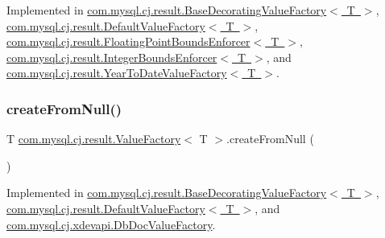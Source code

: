 Implemented in \mbox{\hyperlink{classcom_1_1mysql_1_1cj_1_1result_1_1_base_decorating_value_factory_afac99d3f28348caf19dbd661c609fb9f}{com.\+mysql.\+cj.\+result.\+Base\+Decorating\+Value\+Factory$<$ T $>$}}, \mbox{\hyperlink{classcom_1_1mysql_1_1cj_1_1result_1_1_default_value_factory_a051d2bb4762b37e5318c4b12879fee16}{com.\+mysql.\+cj.\+result.\+Default\+Value\+Factory$<$ T $>$}}, \mbox{\hyperlink{classcom_1_1mysql_1_1cj_1_1result_1_1_floating_point_bounds_enforcer_adafc614949f2e805f53f8d2c2a84923d}{com.\+mysql.\+cj.\+result.\+Floating\+Point\+Bounds\+Enforcer$<$ T $>$}}, \mbox{\hyperlink{classcom_1_1mysql_1_1cj_1_1result_1_1_integer_bounds_enforcer_a7c096b3f99fcd5043d9fba39c621eec2}{com.\+mysql.\+cj.\+result.\+Integer\+Bounds\+Enforcer$<$ T $>$}}, and \mbox{\hyperlink{classcom_1_1mysql_1_1cj_1_1result_1_1_year_to_date_value_factory_a3da51ee200c8868b0a8e2c84cecdb8c1}{com.\+mysql.\+cj.\+result.\+Year\+To\+Date\+Value\+Factory$<$ T $>$}}.

\mbox{\label{interfacecom_1_1mysql_1_1cj_1_1result_1_1_value_factory_a56a65ddc42f449859a1dedb6395016cf}} 
\subsubsection{\texorpdfstring{create\+From\+Null()}{createFromNull()}}
{\footnotesize\ttfamily T \mbox{\hyperlink{interfacecom_1_1mysql_1_1cj_1_1result_1_1_value_factory}{com.\+mysql.\+cj.\+result.\+Value\+Factory}}$<$ T $>$.create\+From\+Null (\begin{DoxyParamCaption}{ }\end{DoxyParamCaption})}



Implemented in \mbox{\hyperlink{classcom_1_1mysql_1_1cj_1_1result_1_1_base_decorating_value_factory_aa7c19e3967273a1c5b806c858165200a}{com.\+mysql.\+cj.\+result.\+Base\+Decorating\+Value\+Factory$<$ T $>$}}, \mbox{\hyperlink{classcom_1_1mysql_1_1cj_1_1result_1_1_default_value_factory_ad19879592d2d343604ceff8f7d6dde84}{com.\+mysql.\+cj.\+result.\+Default\+Value\+Factory$<$ T $>$}}, and \mbox{\hyperlink{classcom_1_1mysql_1_1cj_1_1xdevapi_1_1_db_doc_value_factory_aac55d0e29aad7c0176b3c9d6a95b55f6}{com.\+mysql.\+cj.\+xdevapi.\+Db\+Doc\+Value\+Factory}}.

